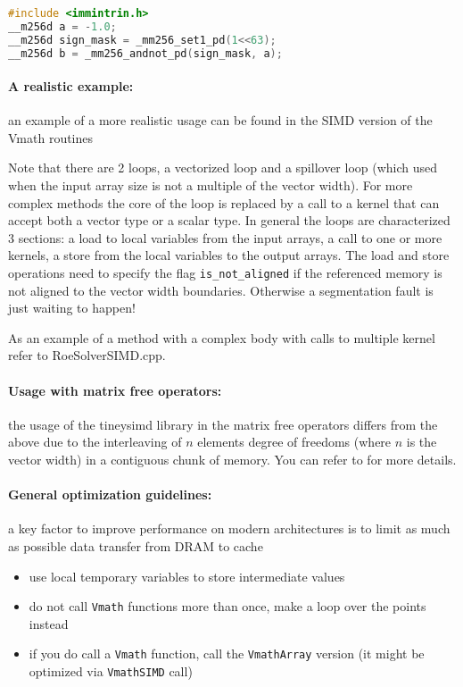 \begin{lstlisting}[language=C++]
#include <immintrin.h>
__m256d a = -1.0;
__m256d sign_mask = _mm256_set1_pd(1<<63);
__m256d b = _mm256_andnot_pd(sign_mask, a);
\end{lstlisting}

\paragraph{A realistic example: } an example of a more realistic usage can be found in the SIMD version of the Vmath routines



Note that there are 2 loops, a vectorized loop and a spillover loop (which used when the input array size is not a multiple of the vector width).
For more complex methods the core of the loop is replaced by a call to a kernel that can accept both a vector type or a scalar type.
In general the loops are characterized 3 sections: a load to local variables from the input arrays, a call to one or more kernels, a store from the local variables to the output arrays.
The load and store operations need to specify the flag \verb+is_not_aligned+ if the referenced memory is not aligned to the vector width boundaries. Otherwise a segmentation fault is just waiting to happen!

As an example of a method with a complex body with calls to multiple kernel refer to RoeSolverSIMD.cpp.

\paragraph{Usage with matrix free operators: }
the usage of the tineysimd library in the matrix free operators differs from the above due to the interleaving of $n$ elements degree of freedoms (where $n$ is the vector width) in a contiguous chunk of memory.
You can refer to \cite{moxey2020efficient} for more details.

\paragraph{General optimization guidelines:} a key factor to improve performance on modern architectures is to limit as much as possible data transfer from DRAM to cache
\begin{itemize}
\item use local temporary variables to store intermediate values
\item do not call \verb+Vmath+ functions more than once, make a loop over the points instead
\item if you do call a \verb+Vmath+ function, call the \verb+VmathArray+ version (it might be optimized via \verb+VmathSIMD+ call)

\end{itemize}
